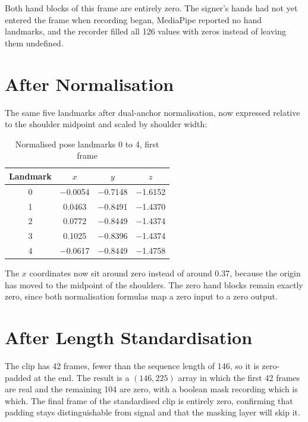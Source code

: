 \noindent Both hand blocks of this frame are entirely zero. The signer's hands had not yet entered the frame when recording began, MediaPipe reported no hand landmarks, and the recorder filled all 126 values with zeros instead of leaving them undefined.

\section{After Normalisation}

The same five landmarks after dual-anchor normalisation, now expressed relative to the shoulder midpoint and scaled by shoulder width:

\begin{table}[htbp]
    \centering
    \caption{Normalised pose landmarks 0 to 4, first frame}
    \label{tab:normvalues}
    \begin{tabular}{cccc}
        \toprule
        \textbf{Landmark} & $x$ & $y$ & $z$ \\
        \midrule
        0 & $-$0.0054 & $-$0.7148 & $-$1.6152 \\
        1 & 0.0463 & $-$0.8491 & $-$1.4370 \\
        2 & 0.0772 & $-$0.8449 & $-$1.4374 \\
        3 & 0.1025 & $-$0.8396 & $-$1.4374 \\
        4 & $-$0.0617 & $-$0.8449 & $-$1.4758 \\
        \bottomrule
    \end{tabular}
\end{table}

\noindent The $x$ coordinates now sit around zero instead of around 0.37, because the origin has moved to the midpoint of the shoulders. The zero hand blocks remain exactly zero, since both normalisation formulas map a zero input to a zero output.

\section{After Length Standardisation}

The clip has 42 frames, fewer than the sequence length of 146, so it is zero-padded at the end. The result is a $(146, 225)$ array in which the first 42 frames are real and the remaining 104 are zero, with a boolean mask recording which is which. The final frame of the standardised clip is entirely zero, confirming that padding stays distinguishable from signal and that the masking layer will skip it.

